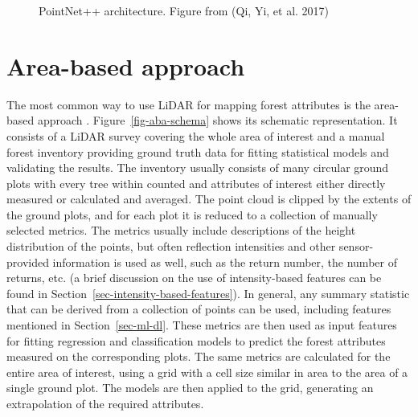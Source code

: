 \begin{figure}
\caption[PointNet++ architecture]{\label{fig-pointnet2-architecture}PointNet++ architecture.
Figure from (Qi, Yi, et al. 2017)}
\end{figure}

\section{Area-based approach}\label{sec-area-based-approach}

The most common way to use LiDAR for mapping forest attributes is the area-based approach \citep{whiteABAGuide2013}.
Figure~\ref{fig-aba-schema} shows its schematic representation.
It consists of a LiDAR survey covering the whole area of interest and a manual forest inventory providing ground truth data for fitting statistical models and validating the results.
The inventory usually consists of many circular ground plots with every tree within counted and attributes of interest either directly measured or calculated and averaged.
The point cloud is clipped by the extents of the ground plots, and for each plot it is reduced to a collection of manually selected metrics.
The metrics usually include descriptions of the height distribution of the points, but often reflection intensities and other sensor-provided information is used as well, such as the return number, the number of returns, etc. (a brief discussion on the use of intensity-based features can be found in Section~\ref{sec-intensity-based-features}).
In general, any summary statistic that can be derived from a collection of points can be used, including features mentioned in Section~\ref{sec-ml-dl}.
These metrics are then used as input features for fitting regression and classification models to predict the forest attributes measured on the corresponding plots.
The same metrics are calculated for the entire area of interest, using a grid with a cell size similar in area to the area of a single ground plot.
The models are then applied to the grid, generating an extrapolation of the required attributes.

